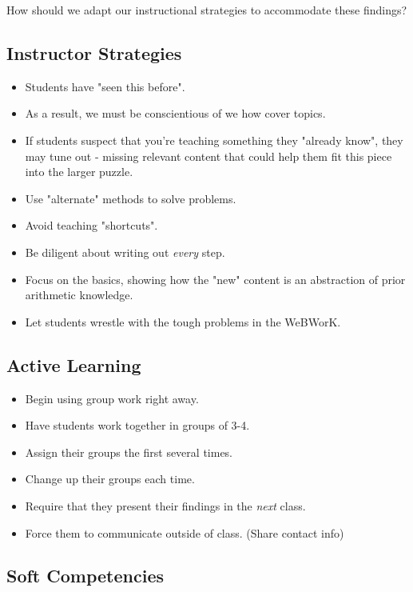 \documentclass{ximera}
\begin{document}
How should we adapt our instructional strategies to accommodate these findings?

\subsection{Instructor Strategies}

\begin{itemize}
 \item Students have "seen this before". 
 \item As a result, we must be conscientious of we how cover topics.
 \item If students suspect that you're teaching something they "already know", they may tune out - missing relevant content that could help them fit this piece into the larger puzzle.
 \item Use "alternate" methods to solve problems.
 \item Avoid teaching "shortcuts". 
 \item Be diligent about writing out \emph{every} step. 
 \item Focus on the basics, showing how the "new" content is an abstraction of prior arithmetic knowledge.
 \item Let students wrestle with the tough problems in the WeBWorK.
\end{itemize}

\subsection{Active Learning}

\begin{itemize}
 \item Begin using group work right away.
 \item Have students work together in groups of 3-4. 
 \item Assign their groups the first several times. 
 \item Change up their groups each time. 
 \item Require that they present their findings in the \emph{next} class. 
 \item Force them to communicate outside of class. (Share contact info)
\end{itemize}

\subsection{Soft Competencies}
\end{document}

